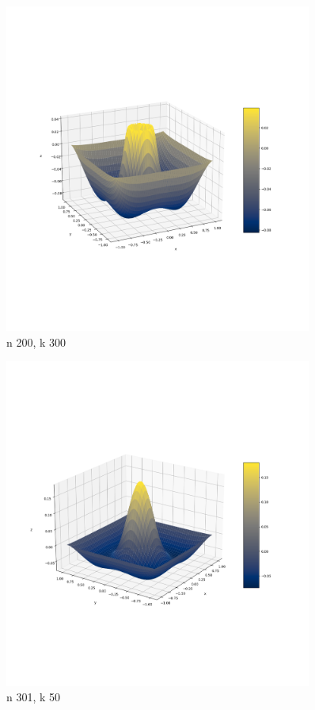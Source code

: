 \documentclass{article}
\begin{document}
    \begin{figure}[h]
        \centering
        \includegraphics[width=0.9\textwidth]{nal1_n200_k300.png}
        \caption{n 200, k 300}
    \end{figure}

    \begin{figure}[h]
        \centering
        \includegraphics[width=0.9\textwidth]{nal1_n301_k50.png}
        \caption{n 301, k 50}
    \end{figure}
\end{document}
